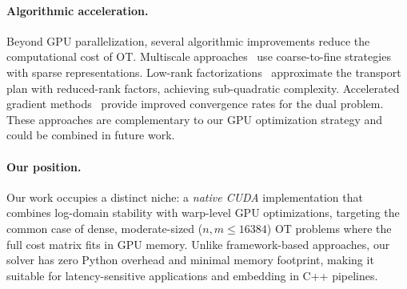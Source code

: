 \paragraph{Algorithmic acceleration.}
Beyond GPU parallelization, several algorithmic improvements reduce the computational cost of OT. Multiscale approaches~\citep{gerber2017multiscale, schmitzer2019stabilized} use coarse-to-fine strategies with sparse representations. Low-rank factorizations~\citep{scetbon2021low} approximate the transport plan with reduced-rank factors, achieving sub-quadratic complexity. Accelerated gradient methods~\citep{dvurechensky2018computational, lin2019efficient} provide improved convergence rates for the dual problem. These approaches are complementary to our GPU optimization strategy and could be combined in future work.

\paragraph{Our position.}
Our work occupies a distinct niche: a \emph{native CUDA} implementation that combines log-domain stability with warp-level GPU optimizations, targeting the common case of dense, moderate-sized ($n, m \leq 16384$) OT problems where the full cost matrix fits in GPU memory. Unlike framework-based approaches, our solver has zero Python overhead and minimal memory footprint, making it suitable for latency-sensitive applications and embedding in C++ pipelines.
